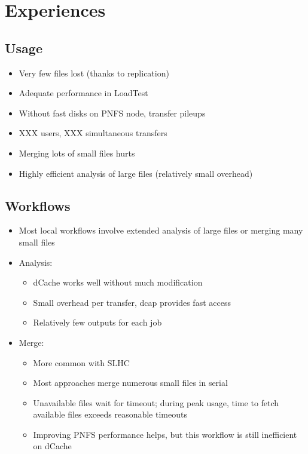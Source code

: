 \documentclass{beamer}
\begin{document}
\section{Experiences}
\subsection{Usage}
\begin{frame}
\begin{itemize}
	\item Very few files lost (thanks to replication)
	\item Adequate performance in LoadTest
	\item Without fast disks on PNFS node, transfer pileups
	\item XXX users, XXX simultaneous transfers
	\item Merging lots of small files hurts
	\item Highly efficient analysis of large files (relatively small overhead)
\end{itemize}
\end{frame}

\subsection{Workflows}
\begin{frame}
\begin{itemize}
	\item Most local workflows involve extended analysis of large files or merging many small files
	\item Analysis:
	\begin{itemize}
		\item dCache works well without much modification
		\item Small overhead per transfer, dcap provides fast access
		\item Relatively few outputs for each job
	\end{itemize}
	\item Merge:
	\begin{itemize}
		\item More common with SLHC
		\item Most approaches merge numerous small files in serial
		\item Unavailable files wait for timeout; during peak usage, time to fetch available files exceeds reasonable timeouts
		\item Improving PNFS performance helps, but this workflow is still inefficient on dCache
	\end{itemize}
\end{itemize}
\end{frame}
\end{document}
